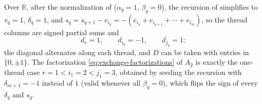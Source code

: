 \begin{remark}\label{rem:signed-threads}
  Over $\mathbb{R}$, after the normalization of 
  ($\alpha_q = 1$, $\beta_q = 0$), the recursion of 
  simplifies to $v_q = 1$, $\delta_q = 1$, and
  $s_q = s_{q+1} - e_{i_q} = -(e_{i_q} + e_{i_{q+1}} + \cdots + e_{i_m})$,
  so the thread columns are signed partial sums and
  \[
    d_r = 1, \qquad d_{i_q} = -1, \qquad d_{j_q} = 1 :
  \]
  the diagonal alternates along each thread, and $D$ can be taken with
  entries in $\{0, \pm 1\}$.  The factorization
  \cref{eq:exchange-factorizations} of $A_2$ is exactly the one-thread case
  $r = 1 < i_1 = 2 < j_1 = 3$, obtained by seeding the recursion with
  $\delta_{m+1} = -1$ instead of $1$ (valid whenever all $\beta_q = 0$),
  which flips the sign of every $\delta_q$ and $s_q$.
\end{remark}
